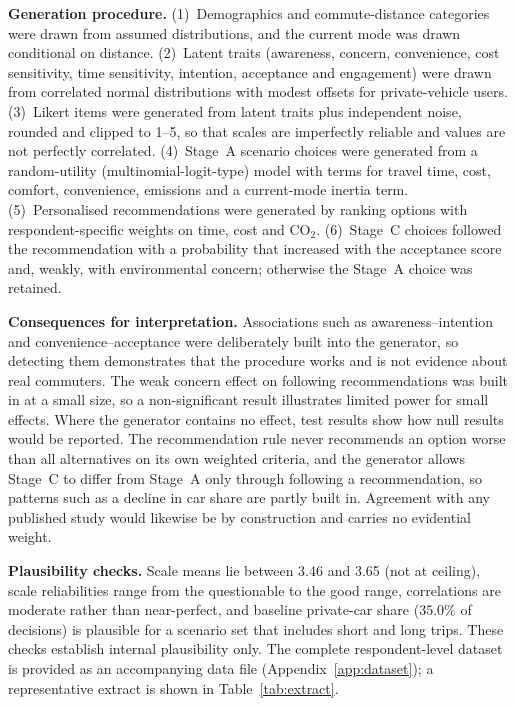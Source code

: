 \documentclass[11pt,a4paper]{article}
\begin{document}
\textbf{Generation procedure.} (1)~Demographics and commute-distance categories were drawn from
assumed distributions, and the current mode was drawn conditional on distance. (2)~Latent traits
(awareness, concern, convenience, cost sensitivity, time sensitivity, intention, acceptance and
engagement) were drawn from correlated normal distributions with modest offsets for private-vehicle
users. (3)~Likert items were generated from latent traits plus independent noise, rounded and clipped
to 1--5, so that scales are imperfectly reliable and values are not perfectly correlated.
(4)~Stage~A scenario choices were generated from a random-utility (multinomial-logit-type) model with
terms for travel time, cost, comfort, convenience, emissions and a current-mode inertia term.
(5)~Personalised recommendations were generated by ranking options with respondent-specific weights on
time, cost and CO$_2$. (6)~Stage~C choices followed the recommendation with a probability that
increased with the acceptance score and, weakly, with environmental concern; otherwise the Stage~A
choice was retained.

\textbf{Consequences for interpretation.} Associations such as awareness--intention and
convenience--acceptance were deliberately built into the generator, so detecting them demonstrates
that the procedure works and is not evidence about real commuters. The weak concern effect on
following recommendations was built in at a small size, so a non-significant result illustrates
limited power for small effects. Where the generator contains no effect, test results show how null
results would be reported. The recommendation rule never recommends an option worse than all
alternatives on its own weighted criteria, and the generator allows Stage~C to differ from Stage~A
only through following a recommendation, so patterns such as a decline in car share are partly built
in. Agreement with any published study would likewise be by construction and carries no evidential
weight.

\textbf{Plausibility checks.} Scale means lie between 3.46 and 3.65 (not at ceiling), scale
reliabilities range from the questionable to the good range, correlations are moderate rather than
near-perfect, and baseline private-car share ($35.0\%$ of decisions) is plausible for a scenario set
that includes short and long trips. These checks establish internal plausibility only. The complete
respondent-level dataset is provided as an accompanying data file (Appendix~\ref{app:dataset}); a
representative extract is shown in Table~\ref{tab:extract}.
\end{document}
